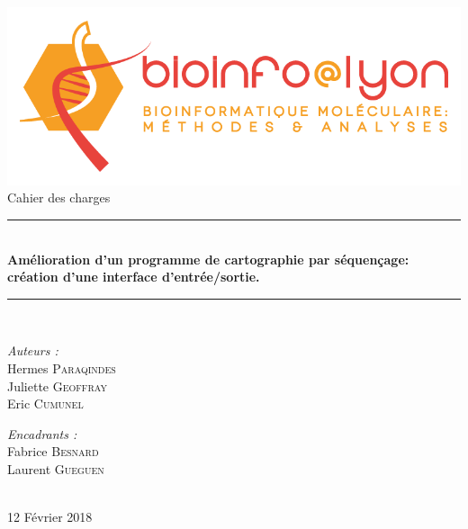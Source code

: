 \documentclass[12pt]{article}
\begin{document}
\begin{titlepage}
\begin{center}

\includegraphics[scale=0.4]{logo.png}\\[3cm]

{\huge Cahier des charges}\\[1cm]

\rule{\linewidth}{0.5mm} \\[0.4cm]
{ \huge \bfseries Amélioration d’un programme de cartographie par séquençage: création d’une interface
d’entrée/sortie. \\[0.4cm] }
\rule{\linewidth}{0.5mm} \\[1.5cm]

\noindent
\begin{minipage}{0.4\textwidth}
  \begin{flushleft} \large
    \emph{Auteurs :}\\
    Hermes \textsc{Paraqindes}\\
    Juliette \textsc{Geoffray}\\
    Eric \textsc{Cumunel}
  \end{flushleft}
\end{minipage}%
\begin{minipage}{0.4\textwidth}
  \begin{flushright} \large
    \emph{Encadrants :} \\
    Fabrice \textsc{Besnard}\\
    Laurent \textsc{Gueguen}\\
  \end{flushright}
\end{minipage}\\[4cm]

{\large 12 Février 2018}

\end{center}
\end{titlepage}

\clearpage
\tableofcontents
\end{document}
